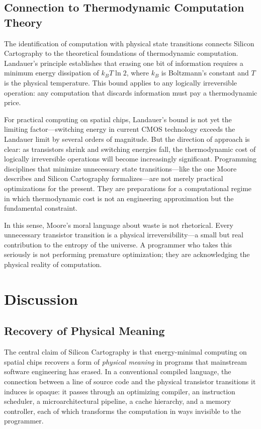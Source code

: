 \documentclass[11pt, a4paper]{article}
\begin{document}
\subsection{Connection to Thermodynamic Computation Theory}

The identification of computation with physical state transitions connects
Silicon Cartography to the theoretical foundations of thermodynamic computation.
Landauer's principle establishes that erasing one bit of information requires
a minimum energy dissipation of $k_B T \ln 2$, where $k_B$ is Boltzmann's
constant and $T$ is the physical temperature. This bound applies to any
logically irreversible operation: any computation that discards information
must pay a thermodynamic price.

For practical computing on spatial chips, Landauer's bound is not yet the
limiting factor---switching energy in current CMOS technology exceeds the
Landauer limit by several orders of magnitude. But the direction of approach
is clear: as transistors shrink and switching energies fall, the thermodynamic
cost of logically irreversible operations will become increasingly significant.
Programming disciplines that minimize unnecessary state transitions---like the
one Moore describes and Silicon Cartography formalizes---are not merely
practical optimizations for the present. They are preparations for a
computational regime in which thermodynamic cost is not an engineering
approximation but the fundamental constraint.

In this sense, Moore's moral language about waste is not rhetorical. Every
unnecessary transistor transition is a physical irreversibility---a small but
real contribution to the entropy of the universe. A programmer who takes this
seriously is not performing premature optimization; they are acknowledging the
physical reality of computation.

\section{Discussion}

\subsection{Recovery of Physical Meaning}

The central claim of Silicon Cartography is that energy-minimal computing on spatial
chips recovers a form of \emph{physical meaning} in programs that mainstream software
engineering has erased. In a conventional compiled language, the connection between
a line of source code and the physical transistor transitions it induces is opaque:
it passes through an optimizing compiler, an instruction scheduler, a microarchitectural
pipeline, a cache hierarchy, and a memory controller, each of which transforms the
computation in ways invisible to the programmer.
\end{document}
